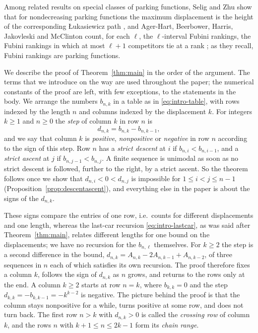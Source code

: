 \documentclass{amsart}
\makeatletter
\theoremstyle{definition}
\theoremstyle{remark}
\numberwithin{equation}{section}
\def\subsection{\@startsection{subsection}{2}\z@{.5\linespacing\@plus.7\linespacing}{-.5em}{\normalfont\bfseries\boldmath}}
\makeatother
\begin{document}
Among related results on special classes of parking functions, Selig and Zhu show that for nondecreasing parking functions the maximum displacement is the height of the corresponding {\L}ukasiewicz path \cite[Theorem~2.1]{seligzhu2024}, and Ager-Hart, Beerbower, Harris, Jakovleski and McClinton count, for each $\ell$, the $\ell$-interval Fubini rankings, the Fubini rankings in which at most $\ell+1$ competitors tie at a rank \cite[Corollary~4.1]{agerhart2026}; as they recall, Fubini rankings are parking functions.

\subsection{Outline of the proof}\label{subsec:intro-outline}

We describe the proof of Theorem~\ref{thm:main} in the order of the argument. The terms that we introduce on the way are used throughout the paper; the numerical constants of the proof are left, with few exceptions, to the statements in the body. We arrange the numbers $b_{n,k}$ in a table as in \eqref{eq:intro-table}, with rows indexed by the length $n$ and columns indexed by the displacement $k$. For integers $k\ge 1$ and $n\ge 0$ the \emph{step} of column $k$ in row $n$ is
\[
d_{n,k}=b_{n,k}-b_{n,k-1},
\]
and we say that column $k$ is \emph{positive}, \emph{nonpositive} or \emph{negative} in row $n$ according to the sign of this step. Row $n$ has a \emph{strict descent} at $i$ if $b_{n,i}<b_{n,i-1}$, and a \emph{strict ascent} at $j$ if $b_{n,j-1}<b_{n,j}$. A finite sequence is unimodal as soon as no strict descent is followed, further to the right, by a strict ascent. So the theorem follows once we show that $d_{n,i}<0<d_{n,j}$ is impossible for $1\le i<j\le n-1$ (Proposition~\ref{prop:descentascent}), and everything else in the paper is about the signs of the $d_{n,k}$.

These signs compare the entries of one row, i.e.\ counts for different displacements and one length, whereas the last-car recursion \eqref{eq:intro-lastcar}, as was said after Theorem~\ref{thm:main}, relates different lengths for one bound on the displacements; we have no recursion for the $b_{n,\ell}$ themselves. For $k\ge 2$ the step is a second difference in the bound, $d_{n,k}=A_{n,k}-2A_{n,k-1}+A_{n,k-2}$, of three sequences in $n$ each of which satisfies its own recursion. The proof therefore fixes a column $k$, follows the sign of $d_{n,k}$ as $n$ grows, and returns to the rows only at the end. A column $k\ge 2$ starts at row $n=k$, where $b_{k,k}=0$ and the step $d_{k,k}=-b_{k,k-1}=-k^{k-2}$ is negative. The picture behind the proof is that the column stays nonpositive for a while, turns positive at some row, and does not turn back. The first row $n>k$ with $d_{n,k}>0$ is called the \emph{crossing row} of column $k$, and the rows $n$ with $k+1\le n\le 2k-1$ form its \emph{chain range}.
\end{document}
